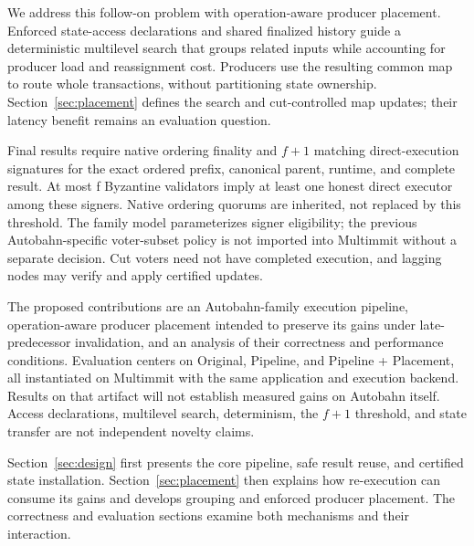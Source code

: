 
We address this follow-on problem with operation-aware producer placement. Enforced state-access declarations and shared finalized history guide a deterministic multilevel search that groups related inputs while accounting for producer load and reassignment cost. Producers use the resulting common map to route whole transactions, without partitioning state ownership. Section~\ref{sec:placement} defines the search and cut-controlled map updates; their latency benefit remains an evaluation question.

Final results require native ordering finality and \(f+1\) matching direct-execution signatures for the exact ordered prefix, canonical parent, runtime, and complete result. At most f Byzantine validators imply at least one honest direct executor among these signers. Native ordering quorums are inherited, not replaced by this threshold. The family model parameterizes signer eligibility; the previous Autobahn-specific voter-subset policy is not imported into Multimmit without a separate decision. Cut voters need not have completed execution, and lagging nodes may verify and apply certified updates. \citep{pbft}

The proposed contributions are an Autobahn-family execution pipeline, operation-aware producer placement intended to preserve its gains under late-predecessor invalidation, and an analysis of their correctness and performance conditions. Evaluation centers on Original, Pipeline, and Pipeline + Placement, all instantiated on Multimmit with the same application and execution backend. Results on that artifact will not establish measured gains on Autobahn itself. Access declarations, multilevel search, determinism, the \(f+1\) threshold, and state transfer are not independent novelty claims.

Section~\ref{sec:design} first presents the core pipeline, safe result reuse, and certified state installation. Section~\ref{sec:placement} then explains how re-execution can consume its gains and develops grouping and enforced producer placement. The correctness and evaluation sections examine both mechanisms and their interaction.

